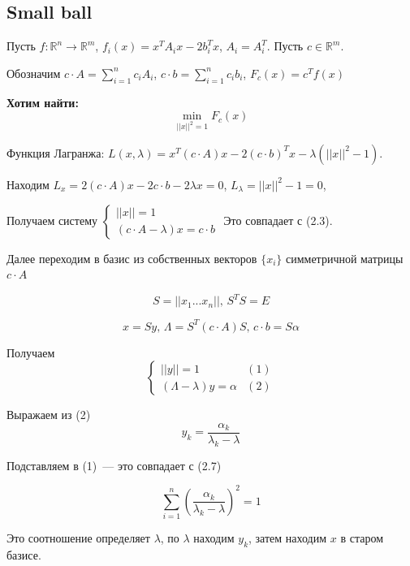 \documentclass[a4paper]{article}
\begin{document}
\subsection{Small ball}
Пусть $f\colon \mathbb{R}^n\to\mathbb{R}^m$, $f_i(x)=x^TA_ix-2b_i^Tx$, $A_i=A_i^T$. Пусть $c\in\mathbb{R}^m$.

Обозначим $c\cdot  A=\sum\limits_{i=1}^n c_iA_i$, $c\cdot b=\sum\limits_{i=1}^n c_ib_i$, $F_c(x)=c^Tf(x)$

{\bf Хотим найти:}
$$\min_{||x||^2=1}F_c(x)$$

Функция Лагранжа:
$L(x,\lambda)=x^T(c\cdot A)x-2(c\cdot b)^T x-\lambda(||x||^2-1)$.

Находим $L_x=2(c\cdot A)x-2c\cdot b-2\lambda x=0$, $L_\lambda=||x||^2-1=0$,

Получаем систему $\begin{cases}
||x||=1\\
(c\cdot A-\lambda)x=c\cdot b
\end{cases}$
Это совпадает с (2.3).

Далее переходим в базис из собственных векторов $\{x_i\}$ симметричной матрицы $c\cdot A$

$$S=||x_1...x_n||,\,S^TS=E$$

$$x=Sy,\,\Lambda=S^T(c\cdot A)S,\,c\cdot b=S\alpha$$

Получаем
$$\begin{cases}
||y||=1 &(1)\\
(\Lambda-\lambda)y=\alpha &(2)
\end{cases}
$$

Выражаем из (2) $$y_k=\frac{\alpha_k}{\lambda_k-\lambda}$$

Подставляем в (1)~--- это совпадает с (2.7)

$$\sum\limits_{i=1}^n (\frac{\alpha_k}{\lambda_k-\lambda})^2=1$$

Это соотношение определяет $\lambda$, по $\lambda$ находим $y_k$, затем находим $x$ в старом базисе.
\end{document}
